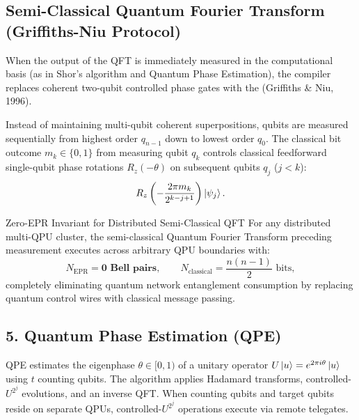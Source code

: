 \subsection{Semi-Classical Quantum Fourier Transform (Griffiths-Niu Protocol)}
\label{sec:semiclassical_qft}

When the output of the QFT is immediately measured in the computational basis (as in Shor's algorithm and Quantum Phase Estimation), the compiler replaces coherent two-qubit controlled phase gates with the  (Griffiths \& Niu, 1996).

Instead of maintaining multi-qubit coherent superpositions, qubits are measured sequentially from highest order $q_{n-1}$ down to lowest order $q_0$. The classical bit outcome $m_k \in \{0, 1\}$ from measuring qubit $q_k$ controls classical feedforward single-qubit phase rotations $R_z(-\theta)$ on subsequent qubits $q_j$ ($j < k$):
\begin{equation}
    R_z\left( -\frac{2\pi m_k}{2^{k - j + 1}} \right) \ket{\psi_j}.
    \label{eq:semiclassical_feedforward_rot}
\end{equation}

\begin{theorembox}{Zero-EPR Invariant for Distributed Semi-Classical QFT}
For any distributed multi-QPU cluster, the semi-classical Quantum Fourier Transform preceding measurement executes across arbitrary QPU boundaries with:
\begin{equation}
    N_{\text{EPR}} = \mathbf{0\text{ Bell pairs}}, \qquad N_{\text{classical}} = \frac{n(n-1)}{2}\text{ bits},
\end{equation}
completely eliminating quantum network entanglement consumption by replacing quantum control wires with classical message passing.
\end{theorembox}

\subsection{5. Quantum Phase Estimation (QPE)}
QPE estimates the eigenphase $\theta \in [0, 1)$ of a unitary operator $U \ket{u} = e^{2\pi i \theta} \ket{u}$ using $t$ counting qubits. The algorithm applies Hadamard transforms, controlled-$U^{2^j}$ evolutions, and an inverse QFT. When counting qubits and target qubits reside on separate QPUs, controlled-$U^{2^j}$ operations execute via remote telegates.

